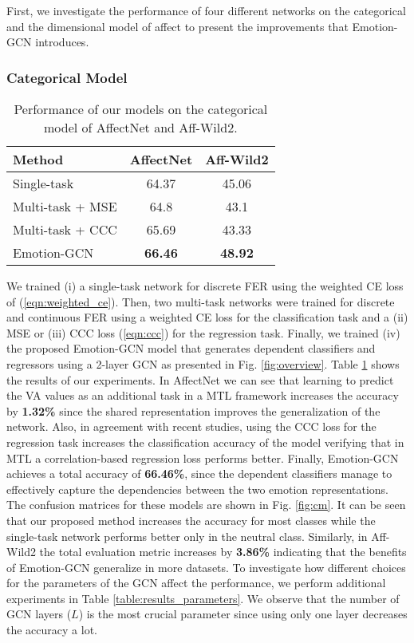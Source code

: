 \documentclass[a4paper, 10pt, conference]{ieeeconf}      \usepackage{FG2021}
\begin{document}
First, we investigate the performance of four different networks on the categorical and the dimensional model of affect to present the improvements that Emotion-GCN introduces.

\subsubsection{Categorical Model} 

\begin{table}[t]
  \caption{Performance of our models on the categorical model of AffectNet and Aff-Wild2.}
  \label{table:results_ours_cat}
  \begin{center}
  \begin{tabular}{lcc}
    \textbf{Method} & \textbf{AffectNet} & \textbf{Aff-Wild2} \\
    \toprule
    Single-task            & 64.37 & 45.06 \\
    Multi-task + MSE       & 64.8 & 43.1 \\
    Multi-task + CCC       & 65.69 & 43.33\\
    Emotion-GCN            & \textbf{66.46} & \textbf{48.92}\\
  \end{tabular}
  \end{center}
\end{table}

We trained (i) a single-task network for discrete FER using the weighted CE loss of (\ref{eqn:weighted_ce}). Then, two multi-task networks were trained for discrete and continuous FER using a weighted CE loss for the classification task and a (ii) MSE or (iii) CCC loss (\ref{eqn:ccc}) for the regression task. Finally, we trained (iv) the proposed Emotion-GCN model that generates dependent classifiers and regressors using a 2-layer GCN as presented in Fig. \ref{fig:overview}. Table \ref{table:results_ours_cat} shows the results of our experiments. In AffectNet we can see that learning to predict the VA values as an additional task in a MTL framework increases the accuracy by \textbf{1.32\%} since the shared representation improves the generalization of the network. Also, in agreement with recent studies, using the CCC loss for the regression task increases the classification accuracy of the model verifying that in MTL a correlation-based regression loss performs better. Finally, Emotion-GCN achieves a total accuracy of \textbf{66.46\%}, since the dependent classifiers manage to effectively capture the dependencies between the two emotion representations. The confusion matrices for these models are shown in Fig. \ref{fig:cm}. It can be seen that our proposed method increases the accuracy for most classes while the single-task network performs better only in the neutral class. Similarly, in Aff-Wild2 the total evaluation metric increases by \textbf{3.86\%} indicating that the benefits of Emotion-GCN generalize in more datasets. To investigate  how different choices for the parameters of the GCN affect the performance, we perform additional experiments in Table \ref{table:results_parameters}. We observe that the number of GCN layers ($L$) is the most crucial parameter since using only one layer decreases the accuracy a lot.
\end{document}

